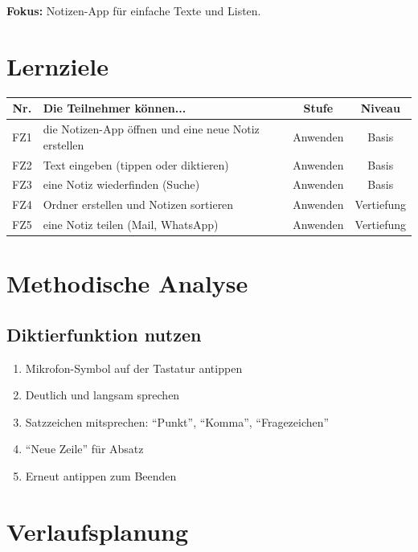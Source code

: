 \documentclass[11pt,a4paper]{article}
\begin{document}
\textbf{Fokus:} Notizen-App für einfache Texte und Listen.

\section{Lernziele}

\begin{tabular}{|c|p{7cm}|c|c|}
\hline
\textbf{Nr.} & \textbf{Die Teilnehmer können...} & \textbf{Stufe} & \textbf{Niveau} \\
\hline
FZ1 & die Notizen-App öffnen und eine neue Notiz erstellen & Anwenden & Basis \\
FZ2 & Text eingeben (tippen oder diktieren) & Anwenden & Basis \\
FZ3 & eine Notiz wiederfinden (Suche) & Anwenden & Basis \\
FZ4 & Ordner erstellen und Notizen sortieren & Anwenden & Vertiefung \\
FZ5 & eine Notiz teilen (Mail, WhatsApp) & Anwenden & Vertiefung \\
\hline
\end{tabular}

\section{Methodische Analyse}

\subsection{Diktierfunktion nutzen}
\begin{tippbox}
\begin{enumerate}
    \item Mikrofon-Symbol auf der Tastatur antippen
    \item Deutlich und langsam sprechen
    \item Satzzeichen mitsprechen: ``Punkt'', ``Komma'', ``Fragezeichen''
    \item ``Neue Zeile'' für Absatz
    \item Erneut antippen zum Beenden
\end{enumerate}
\end{tippbox}

\section{Verlaufsplanung}
\end{document}
